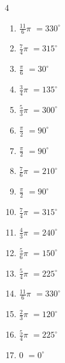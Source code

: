 \begin{multicols}{4}
\begin{enumerate}
  \item $\displaystyle \frac{11}{6}\pi$
        $\displaystyle =330^{\circ}$

  \item $\displaystyle \frac{7}{4}\pi$
        $\displaystyle =315^{\circ}$

  \item $\displaystyle \frac{\pi}{6}$
        $\displaystyle =30^{\circ}$

\columnbreak %

  \item $\displaystyle \frac{3}{4}\pi$
        $\displaystyle =135^{\circ}$

  \item $\displaystyle \frac{5}{3}\pi$
        $\displaystyle =300^{\circ}$

  \item $\displaystyle \frac{\pi}{2}$
        $\displaystyle =90^{\circ}$

  \item $\displaystyle \frac{\pi}{2}$
        $\displaystyle =90^{\circ}$

  \item $\displaystyle \frac{7}{6}\pi$
        $\displaystyle =210^{\circ}$

  \item $\displaystyle \frac{\pi}{2}$
        $\displaystyle =90^{\circ}$

  \item $\displaystyle \frac{7}{4}\pi$
        $\displaystyle =315^{\circ}$

  \item $\displaystyle \frac{4}{3}\pi$
        $\displaystyle =240^{\circ}$

  \item $\displaystyle \frac{5}{6}\pi$
        $\displaystyle =150^{\circ}$

  \item $\displaystyle \frac{5}{4}\pi$
        $\displaystyle =225^{\circ}$

  \item $\displaystyle \frac{11}{6}\pi$
        $\displaystyle =330^{\circ}$

  \item $\displaystyle \frac{2}{3}\pi$
        $\displaystyle =120^{\circ}$

  \item $\displaystyle \frac{5}{4}\pi$
        $\displaystyle =225^{\circ}$

  \item $\displaystyle 0$
        $\displaystyle =0^{\circ}$


\end{enumerate}
\end{multicols}
